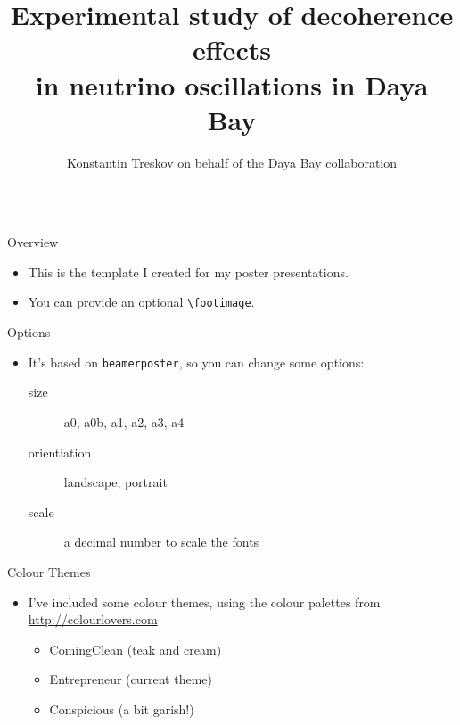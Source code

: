 \documentclass[usenames, dvipsnames]{beamer}
\author[treskov@jinr.ru]{Konstantin Treskov on behalf of the Daya Bay collaboration}
\title{Experimental study of decoherence effects\\ in neutrino oscillations in
Daya Bay}
\institute{Joint Institute for Nuclear Research, Dubna, Russia}
\begin{document}
\begin{frame}[fragile]
\begin{columns}[T]

\begin{column}{.33\textwidth}

\begin{block}{Overview}
\begin{itemize}
\item This is the template I created for my poster presentations.
\item You can provide an optional \verb|\footimage|.
\end{itemize}
\end{block}

\begin{block}{Options}
\begin{itemize}
\item It's based on \texttt{beamerposter}, so you can change some options:
  \begin{description}
  \item[size] a0, a0b, a1, a2, a3, a4
  \item[orientiation] landscape, portrait
  \item[scale] a decimal number to scale the fonts
  \end{description}
\end{itemize}
\end{block}

\begin{block}{Colour Themes}
\begin{itemize}
\item I've included some colour themes, using the colour palettes from \url{http://colourlovers.com}
\begin{itemize}
\item ComingClean (teak and cream)
\item Entrepreneur (current theme)
\item Conspicious (a bit garish!)
\end{itemize}
\end{itemize}
\end{block}

\end{column}

\begin{column}{.3\textwidth}


\end{column}
\end{columns}
\end{frame}
\end{document}
